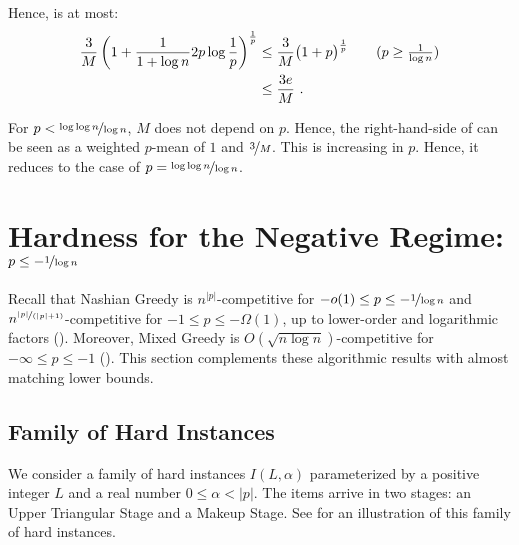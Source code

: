 \documentclass[11pt,letterpaper]{article}
\begin{document}
Hence,  is at most:
\begin{align*}
	\frac{3}{M} \left( 1 + \frac{1}{1+\log n} 2p\log \frac{1}{p} \right)^{\frac{1}{p}}
	&
	\le
	\frac{3}{M} \big( 1 + p \big)^\frac{1}{p} 
	\tag{$p \ge \frac{1}{\log n}$} \\
	&
	\le \frac{3e}{M}
	~.
\end{align*}


For $p < \nicefrac{\log\log n}{\log n}$, $M$ does not depend on $p$.
Hence, the right-hand-side of  can be seen as a weighted $p$-mean of $1$ and $\nicefrac{3}{M}$.
This is increasing in $p$.
Hence, it reduces to the case of $p = \nicefrac{\log\log n}{\log n}$.








 \section[Hardness for the Negative Regime]{Hardness for the Negative Regime: $p \le - \nicefrac{1}{\log n}$}

Recall that Nashian Greedy is $n^{|p|}$-competitive for $-o(1) \le p \le -\nicefrac{1}{\log n}$ and $n^{\nicefrac{|p|}{(|p|+1)}}$-competitive for $-1 \le p \le -\Omega(1)$, up to lower-order and logarithmic factors ().
Moreover, Mixed Greedy is $O(\sqrt{n \log n})$-competitive for $-\infty \le p \le -1$ ().
This section complements these algorithmic results with almost matching lower bounds.

\subsection{Family of Hard Instances}

We consider a family of hard instances $I(L,\alpha)$ parameterized by a positive integer $L$ and a real number $0 \le \alpha < |p|$.
The items arrive in two stages: an Upper Triangular Stage and a Makeup Stage.
See  for an illustration of this family of hard instances.

\bigskip
\end{document}

